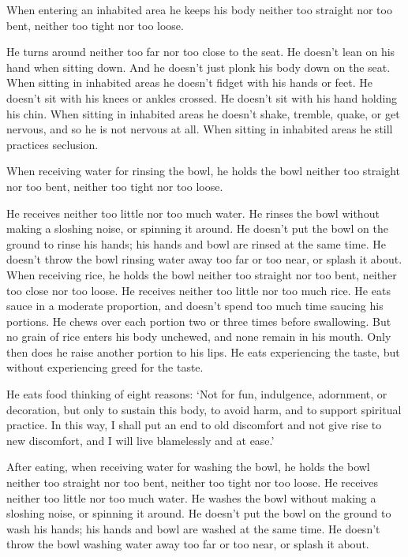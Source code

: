 \documentclass[12pt,openany]{book}%
\begin{document}
When entering an inhabited area he keeps his body neither too straight nor too bent, neither too tight nor too loose. 

He turns around neither too far nor too close to the seat. He doesn’t lean on his hand when sitting down. And he doesn’t just plonk his body down on the seat. When sitting in inhabited areas he doesn’t fidget with his hands or feet. He doesn’t sit with his knees or ankles crossed. He doesn’t sit with his hand holding his chin. When sitting in inhabited areas he doesn’t shake, tremble, quake, or get nervous, and so he is not nervous at all. When sitting in inhabited areas he still practices seclusion. 

When receiving water for rinsing the bowl, he holds the bowl neither too straight nor too bent, neither too tight nor too loose. 

He receives neither too little nor too much water. He rinses the bowl without making a sloshing noise, or spinning it around. He doesn’t put the bowl on the ground to rinse his hands; his hands and bowl are rinsed at the same time. He doesn’t throw the bowl rinsing water away too far or too near, or splash it about. When receiving rice, he holds the bowl neither too straight nor too bent, neither too close nor too loose. He receives neither too little nor too much rice. He eats sauce in a moderate proportion, and doesn’t spend too much time saucing his portions. He chews over each portion two or three times before swallowing. But no grain of rice enters his body unchewed, and none remain in his mouth. Only then does he raise another portion to his lips. He eats experiencing the taste, but without experiencing greed for the taste. 

He eats food thinking of eight reasons: ‘Not for fun, indulgence, adornment, or decoration, but only to sustain this body, to avoid harm, and to support spiritual practice. In this way, I shall put an end to old discomfort and not give rise to new discomfort, and I will live blamelessly and at ease.’ 

After eating, when receiving water for washing the bowl, he holds the bowl neither too straight nor too bent, neither too tight nor too loose. He receives neither too little nor too much water. He washes the bowl without making a sloshing noise, or spinning it around. He doesn’t put the bowl on the ground to wash his hands; his hands and bowl are washed at the same time. He doesn’t throw the bowl washing water away too far or too near, or splash it about. 
\end{document}

